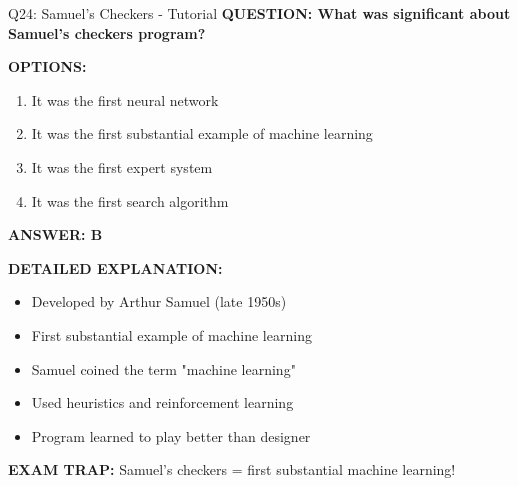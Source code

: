\documentclass[8pt]{beamer}
\begin{document}
	\begin{frame}{Q24: Samuel's Checkers - Tutorial}
		\fontsize{6.5}{7.5}\selectfont
		\textbf{QUESTION: What was significant about Samuel's checkers program?}
		
		\vspace{0.1cm}
		\textbf{OPTIONS:}
		\begin{enumerate}
			\item It was the first neural network
			\item It was the first substantial example of machine learning
			\item It was the first expert system
			\item It was the first search algorithm
		\end{enumerate}
		
		\vspace{0.1cm}
		\textcolor{myblue}{\textbf{ANSWER: B}}
		
		\vspace{0.1cm}
		\textbf{DETAILED EXPLANATION:}
		\begin{itemize}
			\item Developed by Arthur Samuel (late 1950s)
			\item First substantial example of machine learning
			\item Samuel coined the term "machine learning"
			\item Used heuristics and reinforcement learning
			\item Program learned to play better than designer
		\end{itemize}
		
		\vspace{0.1cm}
		\textcolor{myred}{\textbf{EXAM TRAP:}} Samuel's checkers = \textcolor{myblue}{first substantial machine learning}!
	\end{frame}
	
\end{document}
